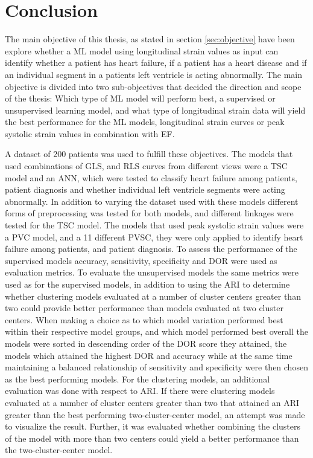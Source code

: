 \chapter{Conclusion} \label{chap:conclusion}

The main objective of this thesis, as stated in section \ref{sec:objective} have been explore whether a ML model using longitudinal strain values as input can identify whether a patient has heart failure, if a patient has a heart disease and if an individual segment in a patients left ventricle is acting abnormally. The main objective is divided into two sub-objectives that decided the direction and scope of the thesis: Which type of ML model will perform best, a supervised or unsupervised learning model, and what type of longitudinal strain data will yield the best performance for the ML models, longitudinal strain curves or peak systolic strain values in combination with EF. \bigskip

A dataset of 200 patients was used to fulfill these objectives. The models that used combinations of GLS, and RLS curves from different views were a TSC model and an ANN, which were tested to classify heart failure among patients, patient diagnosis and whether individual left ventricle segments were acting abnormally. In addition to varying the dataset used with these models different forms of preprocessing was tested for both models, and different linkages were tested for the TSC model. The models that used peak systolic strain values were a PVC model, and a 11 different PVSC, they were only applied to identify heart failure among patients, and patient diagnosis. To assess the performance of the supervised models accuracy, sensitivity, specificity and DOR were used as evaluation metrics. To evaluate the unsupervised models the same metrics were used as for the supervised models, in addition to using the ARI to determine whether clustering models evaluated at a number of cluster centers greater than two could provide better performance than models evaluated at two cluster centers. When making a choice as to which model variation performed best within their respective model groups, and which model performed best overall the models were sorted in descending order of the DOR score they attained, the models which attained the highest DOR and accuracy while at the same time maintaining a balanced relationship of sensitivity and specificity were then chosen as the best performing models. For the clustering models, an additional evaluation was done with respect to ARI. If there were clustering models evaluated at a number of cluster centers greater than two that attained an ARI greater than the best performing two-cluster-center model, an attempt was made to visualize the result. Further, it was evaluated whether combining the clusters of the model with more than two centers could yield a better performance than the two-cluster-center model. \bigskip


